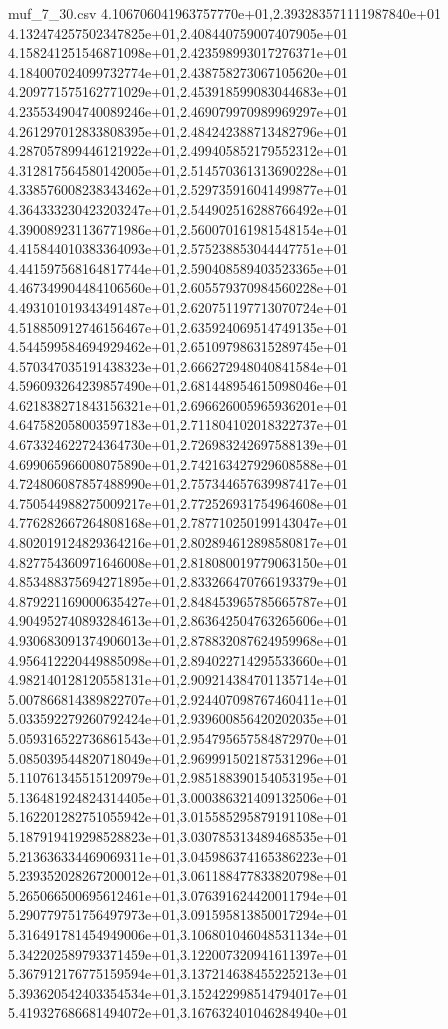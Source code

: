 \begin{filecontents*}{muf_7_30.csv}
4.106706041963757770e+01,2.393283571111987840e+01
4.132474257502347825e+01,2.408440759007407905e+01
4.158241251546871098e+01,2.423598993017276371e+01
4.184007024099732774e+01,2.438758273067105620e+01
4.209771575162771029e+01,2.453918599083044683e+01
4.235534904740089246e+01,2.469079970989969297e+01
4.261297012833808395e+01,2.484242388713482796e+01
4.287057899446121922e+01,2.499405852179552312e+01
4.312817564580142005e+01,2.514570361313690228e+01
4.338576008238343462e+01,2.529735916041499877e+01
4.364333230423203247e+01,2.544902516288766492e+01
4.390089231136771986e+01,2.560070161981548154e+01
4.415844010383364093e+01,2.575238853044447751e+01
4.441597568164817744e+01,2.590408589403523365e+01
4.467349904484106560e+01,2.605579370984560228e+01
4.493101019343491487e+01,2.620751197713070724e+01
4.518850912746156467e+01,2.635924069514749135e+01
4.544599584694929462e+01,2.651097986315289745e+01
4.570347035191438323e+01,2.666272948040841584e+01
4.596093264239857490e+01,2.681448954615098046e+01
4.621838271843156321e+01,2.696626005965936201e+01
4.647582058003597183e+01,2.711804102018322737e+01
4.673324622724364730e+01,2.726983242697588139e+01
4.699065966008075890e+01,2.742163427929608588e+01
4.724806087857488990e+01,2.757344657639987417e+01
4.750544988275009217e+01,2.772526931754964608e+01
4.776282667264808168e+01,2.787710250199143047e+01
4.802019124829364216e+01,2.802894612898580817e+01
4.827754360971646008e+01,2.818080019779063150e+01
4.853488375694271895e+01,2.833266470766193379e+01
4.879221169000635427e+01,2.848453965785665787e+01
4.904952740893284613e+01,2.863642504763265606e+01
4.930683091374906013e+01,2.878832087624959968e+01
4.956412220449885098e+01,2.894022714295533660e+01
4.982140128120558131e+01,2.909214384701135714e+01
5.007866814389822707e+01,2.924407098767460411e+01
5.033592279260792424e+01,2.939600856420202035e+01
5.059316522736861543e+01,2.954795657584872970e+01
5.085039544820718049e+01,2.969991502187531296e+01
5.110761345515120979e+01,2.985188390154053195e+01
5.136481924824314405e+01,3.000386321409132506e+01
5.162201282751055942e+01,3.015585295879191108e+01
5.187919419298528823e+01,3.030785313489468535e+01
5.213636334469069311e+01,3.045986374165386223e+01
5.239352028267200012e+01,3.061188477833820798e+01
5.265066500695612461e+01,3.076391624420011794e+01
5.290779751756497973e+01,3.091595813850017294e+01
5.316491781454949006e+01,3.106801046048531134e+01
5.342202589793371459e+01,3.122007320941611397e+01
5.367912176775159594e+01,3.137214638455225213e+01
5.393620542403354534e+01,3.152422998514794017e+01
5.419327686681494072e+01,3.167632401046284940e+01

\end{filecontents*}
